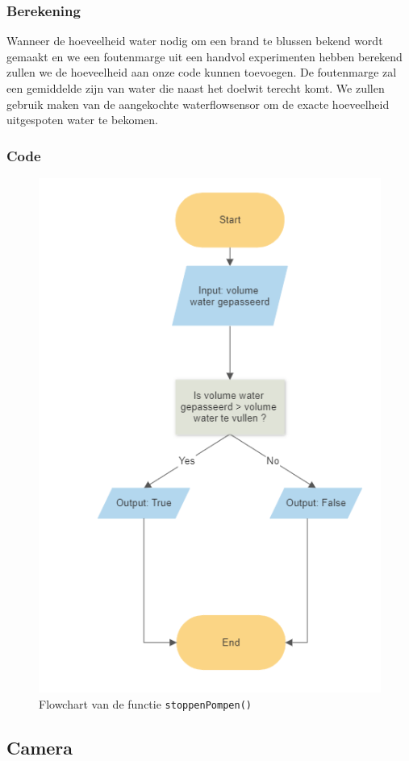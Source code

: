 \documentclass[kulak]{kulakarticle} %
\begin{document}
\subsubsection{Berekening}
Wanneer de hoeveelheid water nodig om een brand te blussen bekend wordt gemaakt en we een foutenmarge uit een handvol experimenten hebben berekend zullen we de hoeveelheid aan onze code kunnen toevoegen. De foutenmarge zal een gemiddelde zijn van water die naast het doelwit terecht komt. We zullen gebruik maken van de aangekochte waterflowsensor om de exacte hoeveelheid uitgespoten water te bekomen. 




\subsubsection{Code}
\begin{figure} [!h]
	\centering
	\includegraphics[width = .4 \textwidth]{flowchart_stoppenPompen}
\cprotect\caption{Flowchart van de functie \verb|stoppenPompen()|}
\end{figure}





\subsection{Camera}
\end{document}
